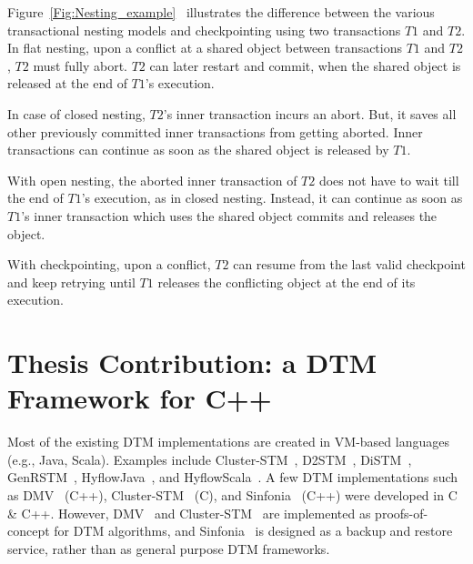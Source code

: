 \documentclass[12pt,english]{report}
\begin{document}
Figure~\ref{Fig:Nesting_example}~\cite{Alex:ONTFA2367601} illustrates the difference between the various transactional nesting models and checkpointing using two transactions $T1$ and $T2$. In flat nesting, upon a conflict at a shared object between transactions $T1$ and $T2$, $T2$ must fully abort. $T2$ can later restart and commit, when the shared object is released at the end of $T1$'s execution. 

In case of closed nesting, $T2$'s inner transaction incurs an abort. But, it saves all other previously committed inner transactions from getting aborted. Inner transactions can continue as soon as the shared object is released by $T1$. 

With open nesting, the aborted inner transaction of $T2$ does not have to wait till the end of $T1$'s execution, as in closed nesting. Instead, it can continue as soon as $T1$'s inner transaction which uses the shared object commits and releases the object. 

With checkpointing, upon a conflict, $T2$ can resume from the last valid checkpoint and keep retrying until $T1$ releases the conflicting object at the end of its execution. 

\section{Thesis Contribution: a DTM Framework for C++}

Most of the existing DTM implementations are created in VM-based languages (e.g., Java, Scala). Examples include Cluster-STM~\cite{Bocchino:2008:STM:1345206.1345242}, D2STM~\cite{D2STM:5368778}, DiSTM~\cite{Kotselidis08distm:a}, GenRSTM~\cite{GenRSTM:6038614}, HyflowJava~\cite{Saad:2011:HHP:1996130.1996167}, and HyflowScala~\cite{turcuhyflow2}. A few DTM implementations such as DMV~\cite{Manassiev:2006:EDV:1122971.1123002} (C++), Cluster-STM~\cite{Bocchino:2008:STM:1345206.1345242} (C), and Sinfonia~\cite{Aguilera:2009:SNP:1629087.1629088} (C++)  were developed in C \& C++. However, DMV~\cite{Manassiev:2006:EDV:1122971.1123002} and Cluster-STM~\cite{Bocchino:2008:STM:1345206.1345242}  are implemented as proofs-of-concept for  DTM algorithms, and Sinfonia~\cite{Aguilera:2009:SNP:1629087.1629088} is designed as a backup and restore service, rather than as general purpose DTM frameworks. 
\end{document}
